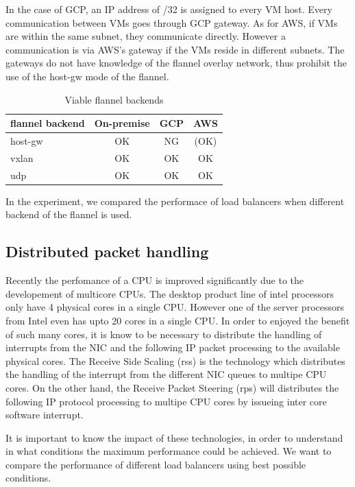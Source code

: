In the case of GCP, an IP address of /32 is assigned to every VM host.
Every communication between VMs goes through GCP gateway.
As for AWS, if VMs are within the same subnet, they communicate directly.
However a communication is via AWS's gateway if the VMs reside in different subnets.
The gateways do not have knowledge of the flannel overlay network, 
thus prohibit the use of the host-gw mode of the flannel.  

\begin{table}
  \begin{tabular}{lccc}
    \toprule
    flannel backend & On-premise & GCP & AWS \\
    \midrule
    host-gw & OK & NG & (OK) \\
    vxlan & OK & OK & OK \\
    udp & OK & OK & OK \\
    \bottomrule
\end{tabular}
  \caption{Viable flannel backends}
  \label{tab:Viable flannel backends}
\end{table}

In the experiment, we compared the performace of load balancers when different backend of the flannel is used. 


\subsection{Distributed packet handling}

Recently the perfomance of a CPU is improved significantly due to the developement of multicore CPUs.
The desktop product line of intel processors only have 4 physical cores in a single CPU.
However one of the server processors from Intel even has upto 20 cores in a single CPU.
In order to enjoyed the benefit of such many cores, 
it is know to be necessary to distribute the handling of interrupts from the NIC and the following IP packet processing
to the available physical cores.
The Receive Side Scaling (rss)\cite{TomHerbert} is the technology which distributes the handling of the interrupt from the
different NIC queues to multipe CPU cores.
On the other hand, the Receive Packet Steering (rps)\cite{TomHerbert} will distributes the following IP protocol processing 
to multipe CPU cores by issueing inter core software interrupt.

It is important to know the impact of these technologies, 
in order to understand in what conditions the maximum performance could be achieved.
We want to compare the performance of different load balancers using best possible conditions.

